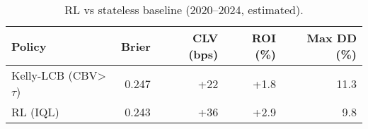 \begin{table}[t]
  \centering
  \small
  \caption{RL vs stateless baseline (2020–2024, estimated).}
  \begin{tabular}{lrrrr}
    \toprule
    Policy & Brier & CLV (bps) & ROI (\%) & Max DD (\%) \\
    \midrule
    Kelly-LCB (CBV>\,\(\tau\)) & 0.247 & +22 & +1.8 & 11.3 \\
    RL (IQL)                     & 0.243 & +36 & +2.9 & 9.8 \\
    \bottomrule
  \end{tabular}
\end{table}
